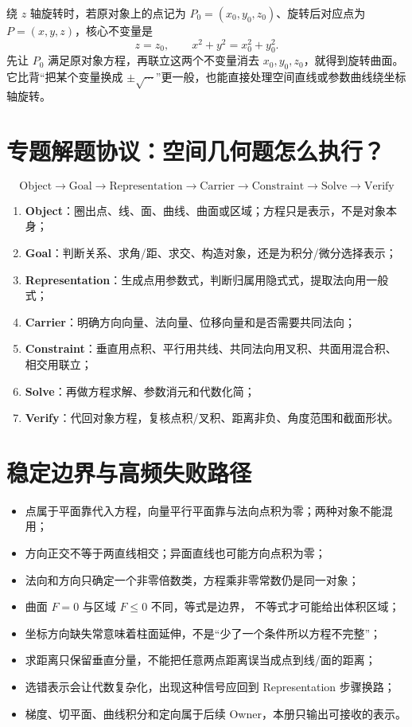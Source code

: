 \documentclass[11pt,a4paper]{ctexart}
\newcommand{\kw}[1]{\textbf{\color{deep}#1}}
\begin{document}
绕 $z$ 轴旋转时，若原对象上的点记为 $P_0=(x_0,y_0,z_0)$、旋转后对应点为 $P=(x,y,z)$，核心不变量是
\[
\boxed{z=z_0,\qquad x^2+y^2=x_0^2+y_0^2}.
\]
先让 $P_0$ 满足原对象方程，再联立这两个不变量消去 $x_0,y_0,z_0$，就得到旋转曲面。它比背“把某个变量换成 $\pm\sqrt{\cdots}$”更一般，也能直接处理空间直线或参数曲线绕坐标轴旋转。

\section{专题解题协议：空间几何题怎么执行？}

\[
\boxed{\text{Object}\to\text{Goal}\to\text{Representation}\to\text{Carrier}\to\text{Constraint}\to\text{Solve}\to\text{Verify}}
\]
\begin{enumerate}
  \item \kw{Object}：圈出点、线、面、曲线、曲面或区域；方程只是表示，不是对象本身；
  \item \kw{Goal}：判断关系、求角/距、求交、构造对象，还是为积分/微分选择表示；
  \item \kw{Representation}：生成点用参数式，判断归属用隐式式，提取法向用一般式；
  \item \kw{Carrier}：明确方向向量、法向量、位移向量和是否需要共同法向；
  \item \kw{Constraint}：垂直用点积、平行用共线、共同法向用叉积、共面用混合积、相交用联立；
  \item \kw{Solve}：再做方程求解、参数消元和代数化简；
  \item \kw{Verify}：代回对象方程，复核点积/叉积、距离非负、角度范围和截面形状。
\end{enumerate}

\section{稳定边界与高频失败路径}

\begin{itemize}
  \item 点属于平面靠代入方程，向量平行平面靠与法向点积为零；两种对象不能混用；
  \item 方向正交不等于两直线相交；异面直线也可能方向点积为零；
  \item 法向和方向只确定一个非零倍数类，方程乘非零常数仍是同一对象；
  \item 曲面 $F=0$ 与区域 $F\le0$ 不同，等式是边界， 不等式才可能给出体积区域；
  \item 坐标方向缺失常意味着柱面延伸，不是“少了一个条件所以方程不完整”；
  \item 求距离只保留垂直分量，不能把任意两点距离误当成点到线/面的距离；
  \item 选错表示会让代数复杂化，出现这种信号应回到 Representation 步骤换路；
  \item 梯度、切平面、曲线积分和定向属于后续 Owner，本册只输出可接收的表示。
\end{itemize}
\end{document}
